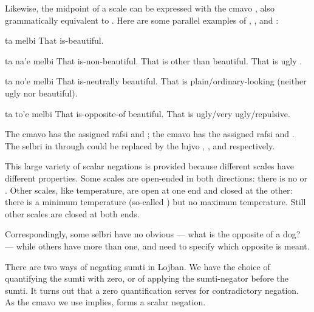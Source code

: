 Likewise, the midpoint of a scale can be expressed with the
    cmavo , also grammatically equivalent to . Here
    are some parallel examples of , , and
    :
\begin{example}
ta melbi\n
That is-beautiful.
\end{example}

\begin{example}
ta na'e melbi\n
That is-non-beautiful.\n
That is other than beautiful.\n
That is ugly .
\end{example}

\begin{example}
ta no'e melbi\n
That is-neutrally beautiful.\n
That is plain/ordinary-looking\n
\T	(neither ugly nor beautiful).
\end{example}

\begin{example}
ta to'e melbi\n
That is-opposite-of beautiful.\n
That is ugly/very ugly/repulsive.
\end{example}

The cmavo  has the assigned rafsi  and
    ; the cmavo  has the assigned rafsi 
    and . The selbri in 
    through  could be replaced by
    the lujvo , , and 
    respectively.

This large variety of scalar negations is provided because
    different scales have different properties. Some scales are
    open-ended in both directions: there is no 
    or . Other scales, like temperature,
    are open at one end and closed at the other: there is a minimum
    temperature (so-called ) but no maximum
    temperature. Still other scales are closed at both ends.

Correspondingly, some selbri have no obvious  ---
    what is the opposite of a dog? --- while others have more than
    one, and need  to specify which opposite is meant.



There are two ways of negating sumti in Lojban. We have the
    choice of quantifying the sumti with zero, or of applying the
    sumti-negator  before the sumti. It turns out that a
    zero quantification serves for contradictory negation. As the
    cmavo we use implies,  forms a scalar negation.


